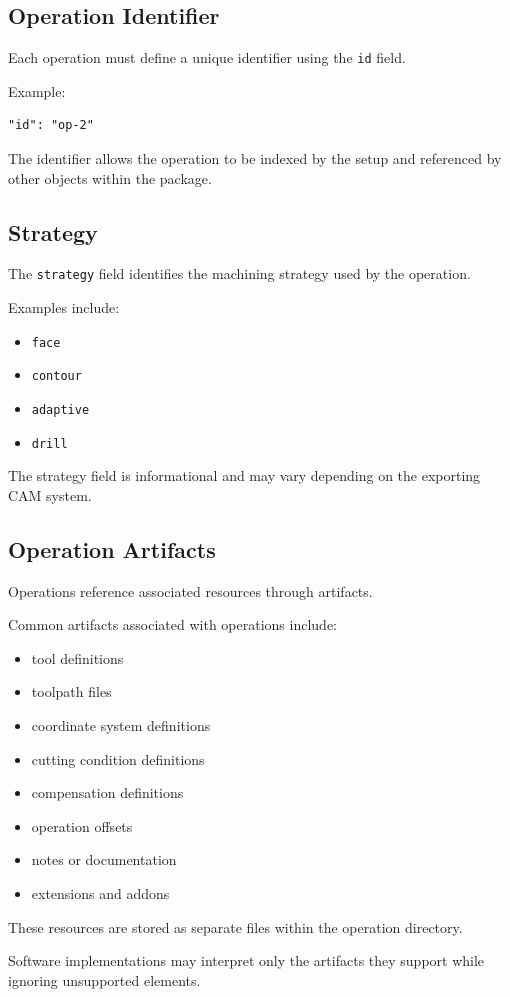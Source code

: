 \subsection{Operation Identifier}

Each operation must define a unique identifier using the \texttt{id} field.

Example:

\begin{verbatim}
"id": "op-2"
\end{verbatim}

The identifier allows the operation to be indexed by the setup and referenced by other objects within the package.

\subsection{Strategy}

The \texttt{strategy} field identifies the machining strategy used by the operation.

Examples include:

\begin{itemize}
\item \texttt{face}
\item \texttt{contour}
\item \texttt{adaptive}
\item \texttt{drill}
\end{itemize}

The strategy field is informational and may vary depending on the exporting CAM system.

\subsection{Operation Artifacts}

Operations reference associated resources through artifacts.

Common artifacts associated with operations include:

\begin{itemize}
\item tool definitions
\item toolpath files
\item coordinate system definitions
\item cutting condition definitions
\item compensation definitions
\item operation offsets
\item notes or documentation
\item extensions and addons
\end{itemize}

These resources are stored as separate files within the operation directory.

Software implementations may interpret only the artifacts they support while ignoring unsupported elements.
